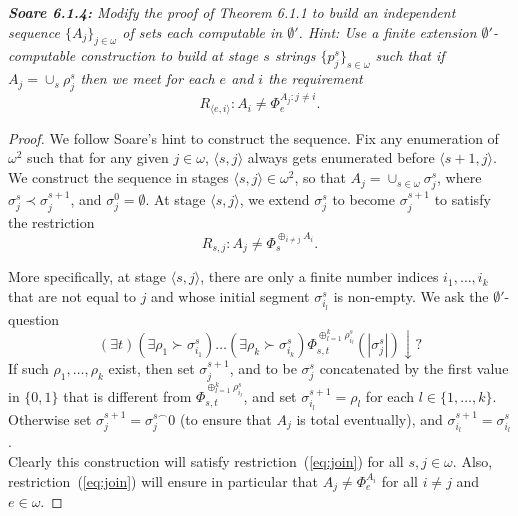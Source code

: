 \documentclass{article}
\begin{document}
\it \textbf{Soare 6.1.4:} Modify the proof of Theorem 6.1.1 to build an
  independent sequence $\{A_j\}_{j\in\omega}$ of sets each computable in
  $\emptyset'$. Hint: Use a finite extension $\emptyset'$-computable
  construction to build at stage $s$ strings $\{p_j^s\}_{s\in\omega}$ such
  that if $A_j=\cup_s \rho_j^s$ then we meet for each $e$ and $i$ the
  requirement
  \[R_{\langle e,i\rangle} :A_i\neq \Phi_e^{A_j:j\neq i}.\]

  \begin{proof}
    We follow Soare's hint to construct the sequence. Fix any enumeration
    of $\omega^2$ such that for any given $j\in\omega$, $\langle
    s,j\rangle$ always gets enumerated before $\langle s+1,j\rangle$. We
    construct the sequence in stages $\langle s,j\rangle \in\omega^2$, so
    that $A_j=\cup_{s\in\omega} \sigma_{j}^s$, where $\sigma_j^s\prec
    \sigma_j^{s+1}$, and $\sigma_j^0=\emptyset$. At stage $\langle
    s,j\rangle$, we extend $\sigma_j^s$ to become $\sigma_j^{s+1}$ to satisfy
    the restriction
    \begin{equation}
      R_{s,j}: A_j \neq \Phi_s^{\oplus_{i\neq j} A_i}.
      \label{eq:join}
    \end{equation}

    More specifically, at stage $\langle s,j\rangle$, there are only a
    finite number indices $i_1,\ldots,i_k$ that are not equal to $j$ and
    whose initial segment $\sigma_{i_l}^s$ is non-empty. We ask the
    $\emptyset'$-question
    \[(\exists t) (\exists \rho_1 \succ \sigma_{i_1}^s) \ldots (\exists
    \rho_k \succ \sigma_{i_k}^s) \Phi_{s,t}^{\oplus_{l=1}^k
    \rho_{i_l}^s}(|\sigma_j^s|) \downarrow?\]
    If such $\rho_1,\ldots,\rho_k$ exist, then set $\sigma_j^{s+1}$, and to
    be $\sigma_j^s$ concatenated by the first value in $\{0,1\}$ that is
    different from $\Phi_{s,t}^{\oplus_{l=1}^k \rho_{i_l}^s}$, and set
    $\sigma_{i_l}^{s+1}=\rho_l$ for each $l\in\{1,\ldots,k\}$.
    Otherwise set $\sigma_j^{s+1}=\sigma_j^{s\frown}0$ (to ensure that
    $A_j$ is total eventually), and $\sigma_{i_l}^{s+1} =\sigma_{i_l}^{s}$.
    \\

    Clearly this construction will satisfy restriction~(\ref{eq:join})
    for all $s,j\in\omega$. Also, restriction~(\ref{eq:join}) will ensure
    in particular that $A_j\neq \Phi_e^{A_i}$ for all $i\neq j$ and
    $e\in\omega$. 
  \end{proof}
\end{document}
